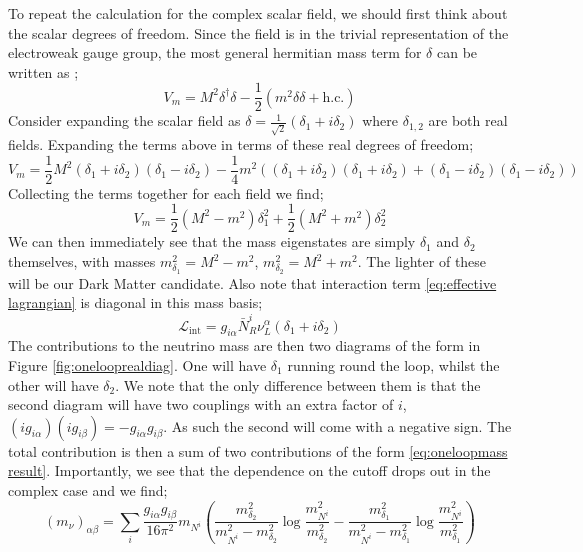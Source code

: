 To repeat the calculation for the complex scalar field, we should first think about the scalar degrees of freedom. Since the field is in the trivial representation of the electroweak gauge group, the most general hermitian mass term for $\delta$ can be written as \cite{Farzan2010};
\begin{equation}
  V_m = M^2 \delta^{\dagger} \delta - \frac{1}{2}(m^2 \delta\delta + \text{h.c.})
\end{equation}
Consider expanding the scalar field as $\delta = \tfrac{1}{\sqrt{2}}(\delta_1 + i\delta_2)$ where $\delta_{1,2}$ are both real fields. Expanding the terms above in terms of these real degrees of freedom;
\begin{dmath}
  V_m = \frac{1}{2}M^2(\delta_1 + i\delta_2)(\delta_1 - i\delta_2) - \frac{1}{4}m^2\left((\delta_1 + i\delta_2)(\delta_1 + i\delta_2) + (\delta_1 - i\delta_2)(\delta_1 - i\delta_2)\right)
\end{dmath}
Collecting the terms together for each field we find;
\begin{equation}
  V_m = \frac{1}{2}(M^2 - m^2)\delta_1^2 + \frac{1}{2}(M^2 + m^2)\delta_2^2
\end{equation}
We can then immediately see that the mass eigenstates are simply $\delta_1$ and $\delta_2$ themselves, with masses $m^2_{\delta_1} = M^2 - m^2$, $m^2_{\delta_2} = M^2 + m^2$. The lighter of these will be our Dark Matter candidate. Also note that interaction term \eqref{eq:effective lagrangian} is diagonal in this mass basis;
\begin{equation}
  \mathcal{L}_{\text{int}} = g_{i\alpha}\bar{N}^i_R \nu^\alpha_L (\delta_1 + i \delta_2)
\end{equation}
The contributions to the neutrino mass are then two diagrams of the form in Figure \ref{fig:onelooprealdiag}. One will have $\delta_1$ running round the loop, whilst the other will have $\delta_2$. We note that the only difference between them is that the second diagram will have two couplings with an extra factor of $i$, $(ig_{i\alpha})(ig_{i\beta}) = -g_{i\alpha}g_{i\beta}$. As such the second will come with a negative sign. The total contribution is then a sum of two contributions of the form \eqref{eq:oneloopmass result}. Importantly, we see that the dependence on the cutoff drops out in the complex case and we find;
\begin{equation}
  (m_\nu)_{\alpha\beta} = \sum_{i}{\frac{g_{i\alpha}g_{i\beta}}{16\pi^2}m_{N^i}\left(\frac{m_{\delta_2}^2}{m_{N^i}^2 - m_{\delta_2}^2}\log\frac{m_{N^i}^2}{m_{\delta_2}^2} - \frac{m_{\delta_1}^2}{m_{N^i}^2 - m_{\delta_1}^2}\log\frac{m_{N^i}^2}{m_{\delta_1}^2}\right)}
\end{equation}



